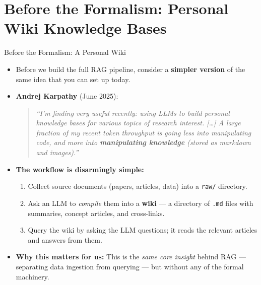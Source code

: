 \documentclass[10pt,english,aspectratio=169]{beamer}
\begin{document}
\section{Before the Formalism: Personal Wiki Knowledge Bases}

\begin{frame}{Before the Formalism: A Personal Wiki}
\begin{itemize}
\item Before we build the full RAG pipeline, consider a \textbf{simpler version} of the same idea that you can set up today.

\medskip
\item \textbf{Andrej Karpathy} (June 2025):
\begin{quote}
\small\itshape
``I'm finding very useful recently: using LLMs to build personal knowledge bases for various topics of research interest. \textnormal{[\ldots]} A large fraction of my recent token throughput is going less into manipulating code, and more into \textbf{manipulating knowledge} (stored as markdown and images).''
\end{quote}

\medskip
\item \textbf{The workflow is disarmingly simple:}
\begin{enumerate}
    \item Collect source documents (papers, articles, data) into a \texttt{raw/} directory.
    \item Ask an LLM to \emph{compile} them into a \textbf{wiki} --- a directory of \texttt{.md} files with summaries, concept articles, and cross-links.
    \item Query the wiki by asking the LLM questions; it reads the relevant articles and answers from them.
\end{enumerate}

\medskip
\item \textbf{Why this matters for us:} This is the \emph{same core insight} behind RAG --- separating data ingestion from querying --- but without any of the formal machinery.
\end{itemize}
\end{frame}
\end{document}
